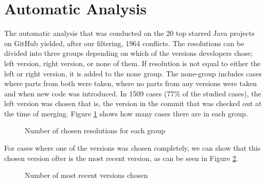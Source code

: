 \section{Automatic Analysis}
\FloatBarrier
The automatic analysis that was conducted on the 20 top starred Java projects on GitHub yielded, after our filtering, 1964 conflicts. The resolutions can be divided into three groups depending on which of the versions developers chose; left version, right version, or none of them. If resolution is not equal to either the left or right version, it is added to the none group. The none-group includes cases where parts from both were taken, where no parts from any versions were taken and when new code was introduced. In 1509 cases (77\% of the studied cases), the left version was chosen that is, the version in the commit that was checked out at the time of merging. Figure \ref{fig:groups} shows how many cases there are in each group.
\FloatBarrier
\begin{figure}
\caption{Number of chosen resolutions for each group}\label{fig:groups}
\end{figure}

For cases where one of the versions was chosen completely, we can show that this chosen version ofter is the most recent version, as can be seen in Figure \ref{fig:recent}.

\begin{figure}
\caption{Number of most recent versions chosen}\label{fig:recent}
\end{figure}

